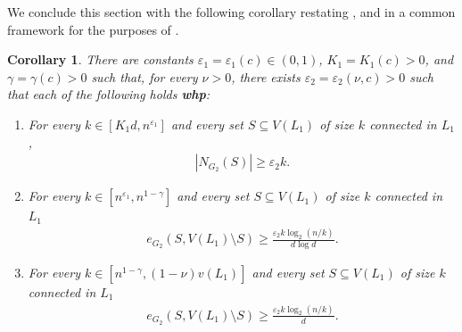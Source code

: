 \documentclass[reqno,final,a4paper]{amsart}
\newtheorem{corollary}[thm]{Corollary}
\theoremstyle{definition}
\def\eps{\varepsilon}
\newcommand{\1}{\mathbbm{1}}
\begin{document}
We conclude this section with the following corollary restating ,  and  in a common framework for the purposes of .

\begin{corollary}\label{cor: new expansion}
There are constants $\eps_1 = \eps_1(c)\in (0,1)$, $K_1 = K_1(c)>0$, and $\gamma=\gamma(c)>0$ such that, for every $\nu>0$, there exists $\eps_2 = \eps_2(\nu,c)>0$ such that each of the following holds \textbf{whp}:
\begin{enumerate}[label=\upshape(\alph*)]
    \item For every $k \in [K_1d,n^{\eps_1}]$ and every set $S\subseteq V(L_1)$ of size $k$ connected in $L_1$,
    \begin{align*}
        |N_{G_2}(S)|\ge \eps_2 k.
    \end{align*} \label{item: small}
    \item For every $k \in [n^{\eps_1},n^{1-\gamma}]$ and every set $S\subseteq V(L_1)$ of size $k$ connected in $L_1$
    \begin{align*}
        e_{G_2}(S, V(L_1)\setminus S)\ge \frac{\eps_2k\log_2(n/k)}{d\log d}.
    \end{align*} \label{item: medium}
    \item For every $k \in [n^{1-\gamma},(1-\nu)v(L_1)]$ and every set $S\subseteq V(L_1)$ of size $k$ connected in $L_1$
    \begin{align*}
        e_{G_2}(S, V(L_1)\setminus S)\ge \frac{\eps_2k\log_2(n/k)}{d}.
    \end{align*} \label{item: large}
\end{enumerate}
\end{corollary}
\end{document}
